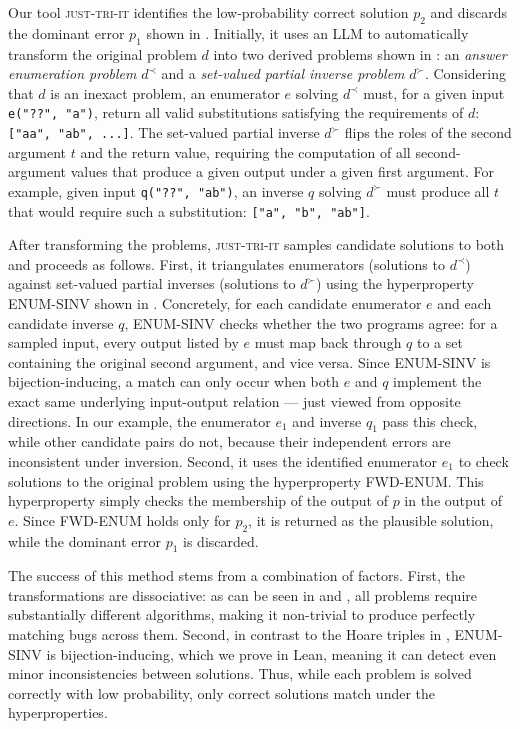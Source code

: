 \documentclass[acmsmall,screen,nonacm]{acmart}
\newcommand{\toolName}{\textsc{just-tri-it}\xspace}
\begin{document}
Our tool \toolName identifies the low-probability correct solution $p_2$ and discards the dominant error $p_1$ shown in . Initially, it uses an LLM to automatically transform the original problem $d$ into two derived problems shown in : an \emph{answer enumeration problem} $d^{\prec}$ and a \emph{set-valued partial inverse problem} $d^{\succ}$. Considering that $d$ is an inexact problem, an enumerator $e$ solving $d^{\prec}$ must, for a given input \texttt{e("??", "a")}, return all valid substitutions satisfying the requirements of $d$: \texttt{["aa", "ab", ...]}. The set-valued partial inverse $d^{\succ}$ flips the roles of the second argument $t$ and the return value, requiring the computation of all second-argument values that produce a given output under a given first argument. For example, given input \texttt{q("??", "ab")}, an inverse $q$ solving $d^{\succ}$ must produce all $t$ that would require such a substitution: \texttt{["a", "b", "ab"]}.

After transforming the problems, \toolName samples candidate solutions to both and proceeds as follows. First, it triangulates enumerators (solutions to $d^{\prec}$) against set-valued partial inverses (solutions to $d^{\succ}$) using the hyperproperty ENUM-SINV shown in . Concretely, for each candidate enumerator $e$ and each candidate inverse $q$, ENUM-SINV checks whether the two programs agree: for a sampled input, every output listed by $e$ must map back through $q$ to a set containing the original second argument, and vice versa. Since ENUM-SINV is bijection-inducing, a match can only occur when both $e$ and $q$ implement the exact same underlying input-output relation --- just viewed from opposite directions. In our example, the enumerator $e_1$ and inverse $q_1$ pass this check, while other candidate pairs do not, because their independent errors are inconsistent under inversion. Second, it uses the identified enumerator $e_1$ to check solutions to the original problem using the hyperproperty FWD-ENUM. This hyperproperty simply checks the membership of the output of $p$ in the output of $e$. Since FWD-ENUM holds only for $p_2$, it is returned as the plausible solution, while the dominant error $p_1$ is discarded.

The success of this method stems from a combination of factors. First, the transformations are dissociative: as can be seen in  and , all problems require substantially different algorithms, making it non-trivial to produce perfectly matching bugs across them. Second, in contrast to the Hoare triples in , ENUM-SINV is bijection-inducing, which we prove in Lean, meaning it can detect even minor inconsistencies between solutions. Thus, while each problem is solved correctly with low probability, only correct solutions match under the hyperproperties.
  
\end{document}
